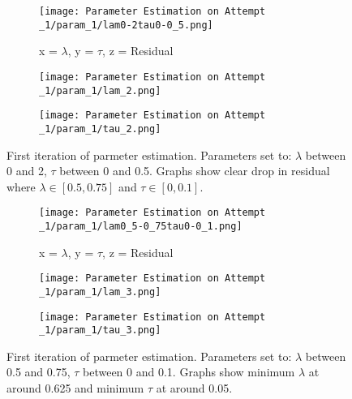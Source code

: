     \begin{figure}
        \begin{subfigure}{.8\textwidth}
        \centering
        \texttt{[image: Parameter Estimation on Attempt \_1/param\_1/lam0-2tau0-0\_5.png]}
        \caption{x = $\lambda$, y = $\tau$, z = Residual}
        \label{pe2:1}
        \end{subfigure}

        \begin{subfigure}{.45\textwidth}
        \centering
        \texttt{[image: Parameter Estimation on Attempt \_1/param\_1/lam\_2.png]}
        \caption{}
        \label{pe2:2}
        \end{subfigure}
        \begin{subfigure}{.45\textwidth}
        \centering
        \texttt{[image: Parameter Estimation on Attempt \_1/param\_1/tau\_2.png]}
        \caption{}
        \label{pe2:3}
        \end{subfigure}
        \caption{First iteration of parmeter estimation. Parameters set to: $\lambda$ between 0 and 2, $\tau$ between 0 and 0.5. Graphs show clear drop in residual where $\lambda \in [0.5,0.75]$ and $\tau \in [0,0.1]$.}
        \label{pe2}
    \end{figure}

    \begin{figure}
        \begin{subfigure}{.8\textwidth}
        \centering
        \texttt{[image: Parameter Estimation on Attempt \_1/param\_1/lam0\_5-0\_75tau0-0\_1.png]}
        \caption{x = $\lambda$, y = $\tau$, z = Residual}
        \label{pe3:1}
        \end{subfigure}

        \begin{subfigure}{.45\textwidth}
        \centering
        \texttt{[image: Parameter Estimation on Attempt \_1/param\_1/lam\_3.png]}
        \caption{}
        \label{pe3:2}
        \end{subfigure}
        \begin{subfigure}{.45\textwidth}
        \centering
        \texttt{[image: Parameter Estimation on Attempt \_1/param\_1/tau\_3.png]}
        \caption{}
        \label{pe3:3}
        \end{subfigure}
        \caption{First iteration of parmeter estimation. Parameters set to: $\lambda$ between 0.5 and 0.75, $\tau$ between 0 and 0.1. Graphs show minimum $\lambda$ at around 0.625 and minimum $\tau$ at around 0.05.}
        \label{pe3}
    \end{figure}

